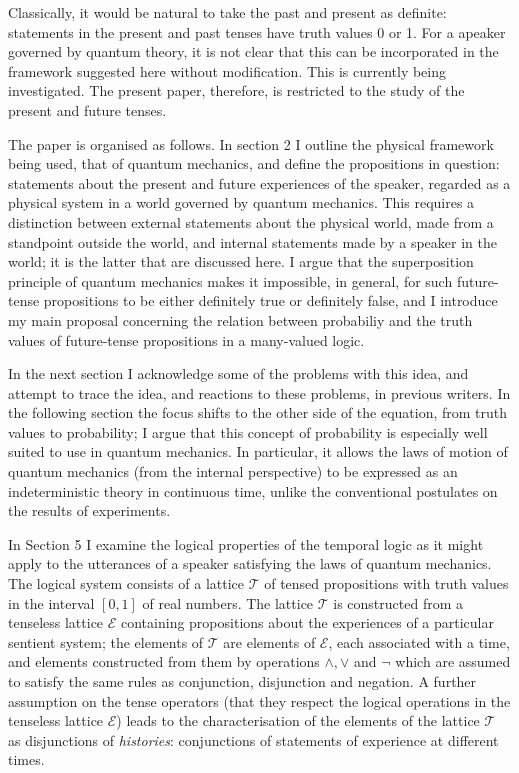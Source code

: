 \documentclass[12pt,a4paper,reqno]{article}
\renewcommand{\(}{\left(}
\renewcommand{\)}{\right)}
\newcommand{\E}{\mathcal{E}}
\newcommand{\T}{\mathcal{T}}
\newcommand{\<}{\langle}
\renewcommand{\>}{\rangle}
\theoremstyle{plain} %
\begin{document}
 Classically, it would be natural to take the past and present as definite: statements in the present and past tenses have truth values 0 or 1. For a apeaker governed by quantum theory, it is not clear that this can be incorporated in the framework suggested here without modification. This is currently being investigated. The present paper, therefore, is restricted to the study of the present and future tenses.


The paper is organised as follows. In section 2 I outline the physical framework being used, that of quantum mechanics, and define the propositions in question: statements about the present and future experiences of the speaker, regarded as a physical system in a world governed by quantum mechanics. This requires a distinction between external statements about the physical world, made from a standpoint outside the world, and internal statements made by a speaker in the world; it is the latter that are discussed here. I argue that the superposition principle of quantum mechanics makes it impossible, in general, for such future-tense propositions to be either definitely true or definitely false, and I introduce my main proposal concerning the relation between probabiliy and the truth values of future-tense propositions in a many-valued logic.  

In the next section I acknowledge some of the problems with this idea, and attempt to trace the idea, and reactions to these problems, in previous writers. In the following section the focus shifts to the other side of the equation, from truth values to probability; I argue that this concept of probability is especially well suited to use in quantum mechanics. In particular, it allows the laws of motion of quantum mechanics (from the internal perspective) to be expressed as an indeterministic theory in continuous time, unlike the conventional postulates on the results of experiments.

 In Section 5 I examine the logical properties of the temporal logic as it might apply to the utterances of a speaker satisfying the laws of quantum mechanics. The logical system consists of a lattice $\T$ of tensed propositions with truth values in the interval $[0,1]$ of real numbers. The lattice $\T$ is constructed from a tenseless lattice $\E$ containing propositions about the experiences of a particular sentient system; the elements of $\T$ are elements of $\E$, each associated with a time, and elements constructed from them by operations $\land, \lor$ and $\lnot$ which are assumed to satisfy the same rules as conjunction, disjunction and negation. A further assumption on the tense operators (that they respect the logical operations in the tenseless lattice $\E$) leads to the characterisation of the elements of the lattice $\T$ as disjunctions of \emph{histories}: conjunctions of statements of experience at different times. 
\end{document}
